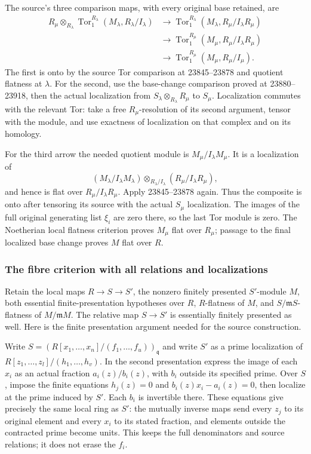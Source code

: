 The source's three comparison maps, with every original base retained, are \[
\begin{aligned}
R_\mu\otimes_{R_\lambda}\operatorname{Tor}_1^{R_\lambda}
 (M_\lambda,R_\lambda/I_\lambda)
&\longrightarrow \operatorname{Tor}_1^{R_\lambda}
 (M_\lambda,R_\mu/I_\lambda R_\mu)\\
&\longrightarrow \operatorname{Tor}_1^{R_\mu}
 (M_\mu,R_\mu/I_\lambda R_\mu)\\
&\longrightarrow \operatorname{Tor}_1^{R_\mu}
 (M_\mu,R_\mu/I_\mu).
\end{aligned}
\] The first is onto by the source Tor comparison at 23845--23878 and quotient flatness at \(\lambda\). For the second, use the base-change comparison proved at 23880--23918, then the actual localization from \(S_\lambda\otimes_{R_\lambda}R_\mu\) to \(S_\mu\). Localization commutes with the relevant Tor: take a free \(R_\mu\)-resolution of its second argument, tensor with the module, and use exactness of localization on that complex and on its homology.

For the third arrow the needed quotient module is \(M_\mu/I_\lambda M_\mu\). It is a localization of \[
(M_\lambda/I_\lambda M_\lambda)
 \otimes_{R_\lambda/I_\lambda}(R_\mu/I_\lambda R_\mu),
\] and hence is flat over \(R_\mu/I_\lambda R_\mu\). Apply 23845--23878 again. Thus the composite is onto after tensoring its source with the actual \(S_\mu\) localization. The images of the full original generating list \(\xi_i\) are zero there, so the last Tor module is zero. The Noetherian local flatness criterion proves \(M_\mu\) flat over \(R_\mu\); passage to the final localized base change proves \(M\) flat over \(R\).

\subsubsection{The fibre criterion with all relations and localizations}\label{the-fibre-criterion-with-all-relations-and-localizations}

Retain the local maps \(R\to S\to S'\), the nonzero finitely presented \(S'\)-module \(M\), both essential finite-presentation hypotheses over \(R\), \(R\)-flatness of \(M\), and \(S/\mathfrak mS\)-flatness of \(M/\mathfrak mM\). The relative map \(S\to S'\) is essentially finitely presented as well. Here is the finite presentation argument needed for the source construction.

Write \(S=(R[x_1,\ldots,x_n]/(f_1,\ldots,f_u))_{\mathfrak q}\) and write \(S'\) as a prime localization of \(R[z_1,\ldots,z_l]/(h_1,\ldots,h_v)\). In the second presentation express the image of each \(x_i\) as an actual fraction \(a_i(z)/b_i(z)\), with \(b_i\) outside its specified prime. Over \(S\), impose the finite equations \(h_j(z)=0\) and \(b_i(z)x_i-a_i(z)=0\), then localize at the prime induced by \(S'\). Each \(b_i\) is invertible there. These equations give precisely the same local ring as \(S'\): the mutually inverse maps send every \(z_j\) to its original element and every \(x_i\) to its stated fraction, and elements outside the contracted prime become units. This keeps the full denominators and source relations; it does not erase the \(f_i\).

